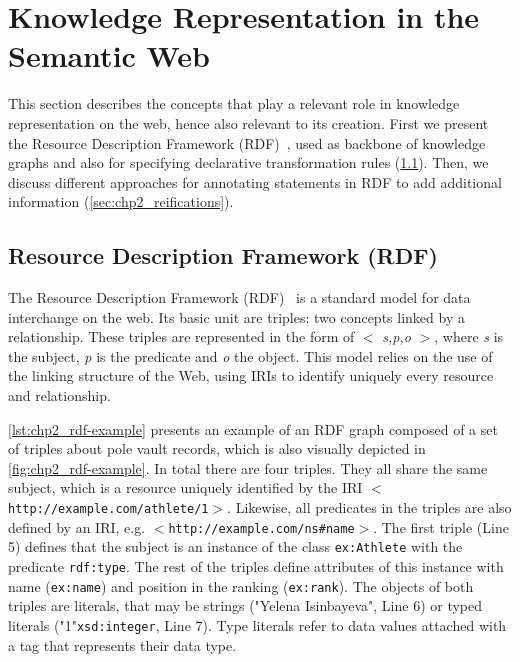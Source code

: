 \section{Knowledge Representation in the Semantic Web}
\label{sec:chp2_semweb}

This section describes the concepts that play a relevant role in knowledge representation on the web, hence also relevant to its creation. First we present the Resource Description Framework (RDF)~\parencite{rdf}, used as backbone of knowledge graphs and also for specifying declarative transformation rules (\cref{sec:chp2_rdf}). Then, we discuss different approaches for annotating statements in RDF to add additional information (\cref{sec:chp2_reifications}).

\subsection{Resource Description Framework (RDF)}
\label{sec:chp2_rdf}

The Resource Description Framework (RDF)~\parencite{rdf} is a standard model for data interchange on the web. Its basic unit are triples: two concepts linked by a relationship. These triples are represented in the form of $<$ \textit{s,p,o} $>$, where \textit{s} is the subject, \textit{p} is the predicate and \textit{o} the object. This model relies on the use of the linking structure of the Web, using IRIs to identify uniquely every resource and relationship. 

\cref{lst:chp2_rdf-example} presents an example of an RDF graph composed of a set of triples about pole vault records, which is also visually depicted in \cref{fig:chp2_rdf-example}. In total there are four triples. They all share the same subject, which is a resource uniquely identified by the IRI $<$\texttt{http://example.com/athlete/1}$>$. Likewise, all predicates in the triples are also defined by an IRI, e.g. $<$\texttt{http://example.com/ns\#name}$>$. The first triple (Line 5) defines that the subject is an instance of the class \texttt{ex:Athlete} with the predicate \texttt{rdf:type}. The rest of the triples define attributes of this instance with name (\texttt{ex:name}) and position in the ranking (\texttt{ex:rank}). The objects of both triples are literals, that may be strings ("Yelena Isinbayeva", Line 6) or typed literals ("1"\scalebox{.8}{\textsuperscript{$\wedge\wedge$}}\texttt{xsd:integer}, Line 7). Type literals refer to data values attached with a tag that represents their data type.

